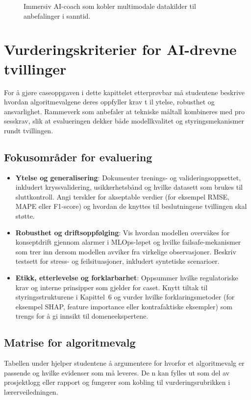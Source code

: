 \begin{figure}[htbp]
    \centering
    \caption{Immersiv AI-coach som kobler multimodale datakilder til anbefalinger i sanntid.}
    \label{fig:kap05-operator-coach}
\end{figure}

\section{Vurderingskriterier for AI-drevne tvillinger}
For å gjøre caseoppgaven i dette kapittelet etterprøvbar må studentene beskrive hvordan algoritmevalgene deres oppfyller krav t
il ytelse, robusthet og ansvarlighet. Rammeverk som \citet{ec2020trustworthyai} anbefaler at tekniske måltall kombineres med pro
sesskrav, slik at evalueringen dekker både modellkvalitet og styringsmekanismer rundt tvillingen.

\subsection{Fokusområder for evaluering}
\begin{itemize}
    \item \textbf{Ytelse og generalisering}: Dokumenter trenings- og valideringsoppsettet, inkludert kryssvalidering, usikkerhetsbånd og hvilke datasett som brukes til sluttkontroll. Angi terskler for akseptable verdier (for eksempel RMSE, MAPE eller F1-score) og hvordan de knyttes til beslutningene tvillingen skal støtte.
    \item \textbf{Robusthet og driftsoppfølging}: Vis hvordan modellen overvåkes for konseptdrift gjennom alarmer i MLOps-løpet og hvilke failsafe-mekanismer som trer inn dersom modellen avviker fra virkelige observasjoner. Beskriv testsett for stress- og feilsituasjoner, inkludert syntetiske scenarioer.
    \item \textbf{Etikk, etterlevelse og forklarbarhet}: Oppsummer hvilke regulatoriske krav og interne prinsipper som gjelder for caset. Knytt tiltak til styringsstrukturene i Kapittel~6 og vurder hvilke forklaringsmetoder (for eksempel SHAP, feature importance eller kontrafaktiske eksempler) som trengs for å gi innsikt til domeneekspertene.
\end{itemize}

\subsection{Matrise for algoritmevalg}
Tabellen under hjelper studentene å argumentere for hvorfor et algoritmevalg er passende og hvilke evidenser som må leveres. De
n kan fylles ut som del av prosjektlogg eller rapport og fungerer som kobling til vurderingsrubrikken i lærerveiledningen.

